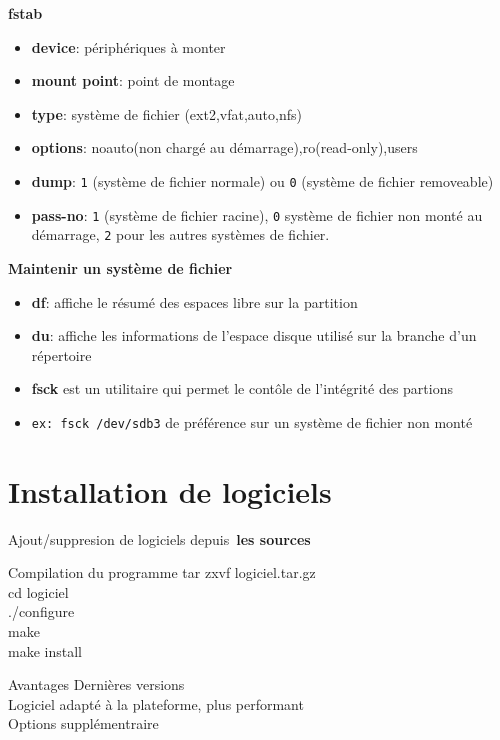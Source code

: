 \documentclass[french]{beamer}
\begin{document}
\begin{frame}
\textbf{fstab}
\begin{itemize}
\item \textbf{device}: périphériques à monter
\item \textbf{mount point}: point de montage
\item \textbf{type}: système de fichier (ext2,vfat,auto,nfs)
\item \textbf{options}: noauto(non chargé au démarrage),ro(read-only),users
\item \textbf{dump}: \texttt{1} (système de fichier normale) ou \texttt{0}
(système de fichier removeable)
\item \textbf{pass-no}: \texttt{1} (système de fichier racine), \texttt{0}
système de fichier non monté au démarrage, \texttt{2} pour les autres systèmes
de fichier.
\end{itemize}
\end{frame}

\begin{frame}
\textbf{Maintenir un système de fichier}
\begin{itemize}
\item \textbf{df}: affiche le résumé des espaces libre sur la partition
\item \textbf{du}: affiche les informations de l'espace disque utilisé sur la
branche d'un répertoire
\item \textbf{fsck} est un utilitaire qui permet le contôle de l'intégrité des
partions
\item \texttt{ex: fsck /dev/sdb3} de préférence sur un système de fichier non
monté
\end{itemize}
\end{frame}


\section{Installation de logiciels}
\frame{\tableofcontents[current]}


\begin{frame}
Ajout/suppresion de logiciels depuis\
\textbf{les sources}
	\begin{block}{Compilation du programme}
	tar zxvf logiciel.tar.gz\\
	cd logiciel\\
	./configure\\
	make\\
	make install\\
	\end{block}
	\begin{block}{Avantages}
	Dernières versions\\
	Logiciel adapté à la plateforme, plus performant\\
	Options supplémentraire\\
	\end{block}
\end{frame}
\end{document}
